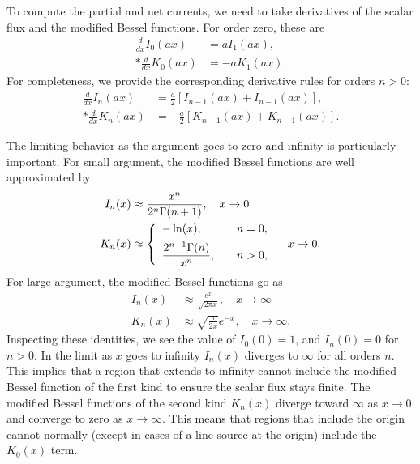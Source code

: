 To compute the partial and net currents, we need to take derivatives of the scalar flux and the modified Bessel functions. For order zero, these are
\begin{subequations}
\begin{align}
  \frac{d}{dx} I_0(ax) &= a I_1(ax) , \\*
  \frac{d}{dx} K_0(ax) &= -a K_1(ax) .  
\end{align}
\end{subequations}
For completeness, we provide the corresponding derivative rules for orders $n > 0$:
\begin{subequations}
\begin{align}
  \frac{d}{dx} I_n(ax) &= \frac{a}{2} [ I_{n-1}(ax) + I_{n-1}(ax) ], \\*
  \frac{d}{dx} K_n(ax) &= -\frac{a}{2} [ K_{n-1}(ax) + K_{n-1}(ax) ].  
\end{align}
\end{subequations}

The limiting behavior as the argument goes to zero and infinity is particularly important. For small argument, the modified Bessel functions are well approximated by
\begin{subequations}
\begin{align}
  I_n(x) &\approx \frac{ x^n }{ 2^n \Gamma(n+1) }, \quad x \rightarrow 0  \\
  K_n(x) &\approx \left\{ \begin{array}{l l} 
  -\ln(x), 								& \quad n = 0, \vspace{0.5em} \\
  \dfrac{ 2^{n-1} \Gamma(n) }{ x^n } ,	& \quad n > 0, \end{array} \right. \quad x \rightarrow 0.
\end{align}
\end{subequations}
For large argument, the modified Bessel functions go as
\begin{subequations}
\begin{align}
  I_n(x) &\approx \frac{ e^x }{ \sqrt{ 2\pi x } }, \quad x \rightarrow \infty \\
  K_n(x) &\approx \sqrt{ \frac{ \pi }{ 2x } } e^{-x} , \quad x \rightarrow \infty.
\end{align}
\end{subequations}
Inspecting these identities, we see the value of $I_0(0) = 1$, and $I_n(0) = 0$ for $n > 0$. In the limit as $x$ goes to infinity $I_n(x)$ diverges to $\infty$ for all orders $n$. This implies that a region that extends to infinity cannot include the modified Bessel function of the first kind to ensure the scalar flux stays finite. The modified Bessel functions of the second kind $K_n(x)$ diverge toward $\infty$ as $x \rightarrow 0$ and converge to zero as $x \rightarrow \infty$. This means that regions that include the origin cannot normally (except in cases of a line source at the origin) include the $K_0(x)$ term.

